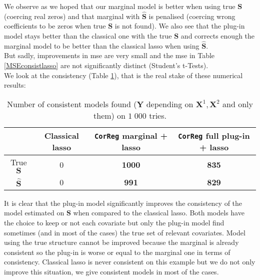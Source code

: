 \documentclass[12pt,a4paper]{report}
\begin{document}
		We observe as we hoped that our marginal model is better when using true $\boldsymbol{S}$ (coercing real zeros) and that marginal with $\hat{\boldsymbol{S}}$ is penalised (coercing wrong coefficients to be zeros when true $\boldsymbol{S}$ is not found).
		We also see that the plug-in model stays better than the classical one with the true $\boldsymbol{S}$ and corrects enough the marginal model to be better than the classical {\sc lasso} when using $\hat{\boldsymbol{S}}$. \\
		
		But sadly, improvements in {\sc mse} are very small and the {\sc mse} in Table \ref{MSEconsistlasso} are not significantly distinct (Student's t-Tests).\\
		\newpage
		We look at the consistency (Table \ref{testidentifiableG}), that is the real stake of these numerical results:
		\begin{table}[h!]	
		\centering
		\begin{tabular}{|c|c|c|c|}
		\hline 
		 & Classical {\sc lasso} & {\tt CorReg}  marginal + {\sc lasso}& {\tt CorReg}  full plug-in  + {\sc lasso} \\ 
		\hline 
		True $\boldsymbol{S}$ &  0 & \textbf{1000} & \textbf{835} \\ 
		\hline 
		$\hat{\boldsymbol{S}}$ & 0 & \textbf{991} & \textbf{829} \\ 
		\hline 
		\end{tabular} 
		\caption{Number of consistent models found ($\boldsymbol{Y}$ depending on $\boldsymbol{X}^1,\boldsymbol{X}^2$ and only them) on $1\;000$ tries.}\label{testidentifiableG}
		\end{table}	
		\FloatBarrier			
		It is clear that the plug-in model significantly improves the consistency of the model estimated on $\boldsymbol{S}$ when compared to the classical {\sc lasso}. Both models have the choice to keep or not each covariate but only the plug-in model find sometimes (and in most of the cases) the true set of relevant covariates. Model using the true structure cannot be improved because the marginal is already consistent so the plug-in is worse or equal to the marginal one in terms of consistency. Classical {\sc lasso} is never consistent on this example but we do not only improve this situation, we give consistent models in most of the cases.\\
		
\end{document}
